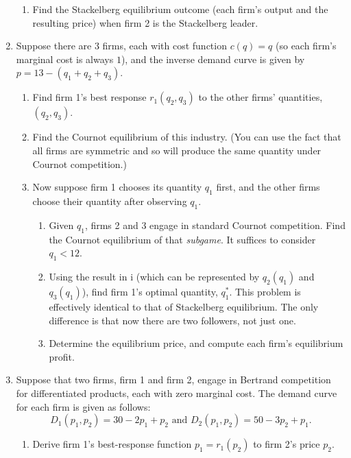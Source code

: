 \documentclass[11pt]{article}
\begin{document}
\begin{enumerate}
\begin{enumerate}
        \item Find the Stackelberg equilibrium outcome (each firm's output and the resulting price) when firm 2 is the Stackelberg leader.
    \end{enumerate}

\item Suppose there are $3$ firms, each with cost function $c(q)=q$ (so each firm's marginal cost is always $1$), and the inverse demand curve is given by $p=13-(q_{1}+q_{2}+q_{3})$.
    \begin{enumerate}
        \item Find firm 1's best response $r_{1}(q_{2},q_{3})$ to the other firms' quantities, $(q_{2},q_{3})$.

        \item Find the Cournot equilibrium of this industry. (You can use the fact that all firms are symmetric and so will produce the same quantity under Cournot competition.)

        \item Now suppose firm 1 chooses its quantity $q_{1}$ first, and the other firms choose their quantity after observing $q_{1}$.
            \begin{enumerate}
                \item Given $q_{1}$, firms 2 and 3 engage in standard Cournot competition. Find the Cournot equilibrium of that \emph{subgame}. It suffices to consider $q_{1}<12$.

                \item Using the result in i (which can be represented by $q_{2}(q_{1})$ and $q_{3}(q_{1})$), find firm 1's optimal quantity, $q_{1}^{\ast}$. This problem is effectively identical to that of Stackelberg equilibrium. The only difference is that now there are two followers, not just one.

                \item Determine the equilibrium price, and compute each firm's equilibrium profit.
                \end{enumerate}
    \end{enumerate}

\item Suppose that two firms, firm 1 and firm 2, engage in Bertrand competition for differentiated products, each with zero marginal cost. The demand curve for each firm is given as follows:
	\begin{equation*}
	D_{1}(p_{1},p_{2})=30-2p_{1}+p_{2}\text{ and }D_{2}(p_{1},p_{2})=50-3p_{2}+p_{1}.
	\end{equation*}
	\begin{enumerate}
	\item Derive firm 1's best-response function $p_{1}=r_{1}(p_{2})$ to firm 2's price $p_{2}$.


\end{enumerate}
\end{enumerate}
\end{document}
